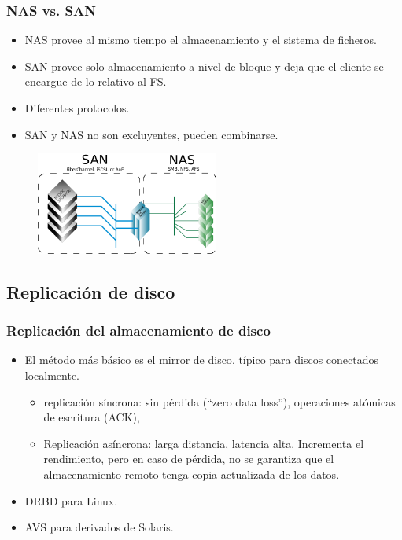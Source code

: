 \documentclass{beamer}
\begin{document}
\begin{frame}
  \frametitle{NAS vs. SAN}
  \begin{itemize}
\small
    \item NAS provee  al mismo tiempo el almacenamiento y el sistema de ficheros.
    \item SAN provee solo almacenamiento a nivel de bloque y deja que el cliente se encargue de lo relativo al FS.  
    \item Diferentes protocolos.
    \item SAN y NAS no son excluyentes, pueden combinarse.
  \end{itemize}

\normalsize

\begin{figure}[h]
\begin{center}
  \includegraphics[width=6cm]{figs/SANvsNAS.png}
\end{center}
\end{figure}

\end{frame}

\subsection{Replicación de disco}

\begin{frame}
  \frametitle{Replicación del almacenamiento de disco}
  \begin{itemize}
    \item El método más básico es el \alert{mirror de disco}, típico para discos conectados localmente.
	  \begin{itemize}
	    \item \alert{replicación síncrona:} sin pérdida (``zero data loss''), operaciones atómicas de escritura (ACK),
	    \item \alert{Replicación asíncrona}: larga distancia, latencia alta. Incrementa el rendimiento, pero en caso de pérdida, no se garantiza que el almacenamiento remoto tenga copia actualizada de los datos.
	  \end{itemize}
    \item DRBD para Linux. 
    \item AVS para derivados de Solaris.
  \end{itemize}
\end{frame}
\end{document}
